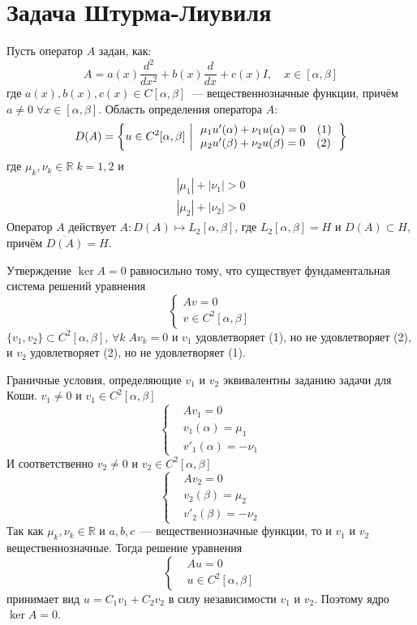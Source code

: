 \documentclass[14pt]{extarticle}
\begin{document}
\section*{Задача Штурма-Лиувиля}

Пусть оператор $A$ задан, как:
$$
A = a(x)\dfrac{d^2}{dx^2} + b(x)\dfrac{d}{dx} + c(x)I, \quad x \in [\alpha, \beta]
$$
где $a(x), b(x), c(x) \in C[\alpha, \beta]$~--- вещественнозначные функции, причём $a \ne 0\;
\forall x \in [\alpha, \beta]$.
Область определения оператора $A$:
$$
D(A) = \left\{ u \in C^2[\alpha,\beta] \left\arrowvert
\begin{array}{l}
    \mu_1 u'(\alpha) + \nu_1 u(\alpha) = 0 \quad (1)\\
    \mu_2 u'(\beta) + \nu_2 u(\beta) = 0 \quad (2)
\end{array}
\right.\right\}
$$
где $\mu_k, \nu_k \in \mathbb R\;k = 1,2$ и
\begin{gather*}
    |\mu_1| + |\nu_1| > 0\\
    |\mu_2| + |\nu_2| > 0
\end{gather*}
Оператор $A$ действует $A : D(A) \mapsto L_2[\alpha, \beta]$, где $L_2[\alpha, \beta] = H$ и
$D(A) \subset H$, причём $\overline{D(A)} = H$.
\begin{MathCl}{Утверждение}
    $\ker A = 0$ равносильно тому, что существует фундаментальная система решений
    уравнения
    $$
    \left\{
    \begin{array}{l}
        Av = 0\\
        v \in C^2[\alpha, \beta]
    \end{array}
    \right.
    $$
    $\{v_1, v_2\} \subset C^2[\alpha, \beta]$, $\forall k\;Av_k = 0$ и $v_1$ удовлетворяет (1), но
    не удовлетворяет (2), и $v_2$ удовлетворяет (2), но не удовлетворяет (1).
\end{MathCl}
\begin{Proof}
    Граничные условия, определяющие $v_1$ и $v_2$ эквивалентны заданию задачи для 
    Коши.
    $v_1 \ne 0$ и $v_1 \in C^2[\alpha, \beta]$
    $$
    \left\{
    \begin{aligned}
        &Av_1 = 0\\
        &v_1(\alpha) = \mu_1\\
        &v'_1(\alpha) = -\nu_1
    \end{aligned}
    \right.
    $$
    И соответственно $v_2 \ne 0$ и $v_2 \in C^2[\alpha, \beta]$
    $$
    \left\{
    \begin{aligned}
        &Av_2 = 0\\
        &v_2(\beta) = \mu_2\\
        &v'_2(\beta) = -\nu_2
    \end{aligned}
    \right.
    $$
    Так как $\mu_k, \nu_k \in \mathbb R$ и $a, b, c$~--- вещественнозначные функции, 
    то и $v_1$ и $v_2$ вещественнозначные.
    Тогда решение уравнения
    $$
    \left\{
    \begin{aligned}
        &Au = 0\\
        &u \in C^2[\alpha, \beta]
    \end{aligned}
    \right.
    $$
    принимает вид $u = C_1 v_1 + C_2 v_2$ в силу независимости $v_1$ и $v_2$.
    Поэтому ядро $\ker A = 0$.
\end{Proof}
\end{document}
